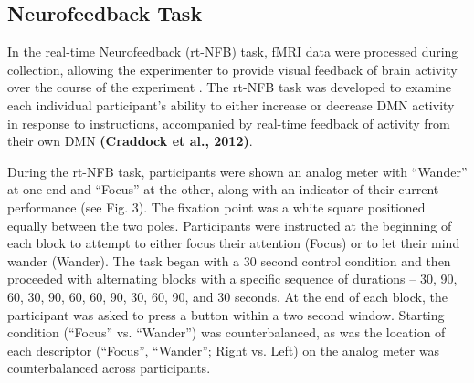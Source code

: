 \subsection{Neurofeedback Task}

In the real-time Neurofeedback (rt-NFB) task, fMRI data were processed during collection, allowing the experimenter to provide visual feedback of brain activity over the course of the experiment \cite{Cox_1995,LaConte_2011,McDonald2017}. The rt-NFB task was developed to examine each individual participant's ability to either increase or decrease DMN activity in response to instructions, accompanied by real-time feedback of activity from their own DMN \cite{McDonald2017}\textbf{(Craddock et al., 2012)}.

During the rt-NFB task, participants were shown an analog meter with ``Wander'' at one end and ``Focus'' at the other, along with an indicator of their current performance (see Fig. 3). The fixation point was a white square positioned equally between the two poles. Participants were instructed at the beginning of each block to attempt to either focus their attention (Focus) or to let their mind wander (Wander). The task began with a 30 second control condition and then proceeded with alternating blocks with a specific sequence of durations -- 30, 90, 60, 30, 90, 60, 60, 90, 30, 60, 90, and 30 seconds. At the end of each block, the participant was asked to press a button within a two second window. Starting condition (``Focus'' vs. ``Wander'') was counterbalanced, as was the location of each descriptor (``Focus'', ``Wander''; Right vs. Left) on the analog meter was counterbalanced across participants. 

